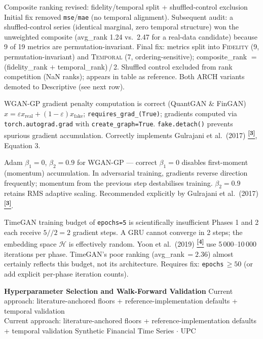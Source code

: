 \documentclass[10pt]{article}
\newcommand{\pagehead}[2]{%
  \begin{tcolorbox}[enhanced,arc=0pt,outer arc=0pt,boxrule=0pt,
    colback=Navy,colframe=Navy,
    top=5pt,bottom=5pt,left=8pt,right=8pt,
    before skip=0pt,after skip=10pt]
  {\color{white}\large\bfseries #1}%
  \ifx\relax#2\relax\else\\[1pt]{\color{blue!30!white}\small #2}\fi
  \hfill{\color{blue!20!white}\footnotesize Synthetic Financial Time Series $\cdot$ UPC}
  \end{tcolorbox}}
\newcommand{\tcite}[1]{%
  \hyperlink{R:#1}{\textsuperscript{\scriptsize\textbf{[#1]}}}}
\begin{document}
%
  {Composite ranking revised: fidelity/temporal split + shuffled-control exclusion}%
  {Initial fix removed \texttt{mse}/\texttt{mae} (no temporal alignment). Subsequent audit: a shuffled-control series (identical marginal, zero temporal structure) won the unweighted composite (avg\_rank 1.24 vs.\ 2.47 for a real-data candidate) because 9 of 19 metrics are permutation-invariant. Final fix: metrics split into \textsc{Fidelity} (9, permutation-invariant) and \textsc{Temporal} (7, ordering-sensitive); composite\_rank $=$ (fidelity\_rank $+$ temporal\_rank)\,/\,2. Shuffled control excluded from rank competition (NaN ranks); appears in table as reference. Both ARCH variants demoted to Descriptive (see next row).}

%
  {WGAN-GP gradient penalty computation is correct (QuantGAN \& FinGAN)}%
  {$\hat{x} = \varepsilon x_\text{real} + (1-\varepsilon)x_\text{fake}$; \texttt{requires\_grad\_(True)}; gradients computed via \texttt{torch.autograd.grad} with \texttt{create\_graph=True}. \texttt{fake.detach()} prevents spurious gradient accumulation. Correctly implements Gulrajani et al.\ (2017)\tcite{3}, Equation 3.}

%
  {Adam $\beta_1=0$, $\beta_2=0.9$ for WGAN-GP --- correct}%
  {$\beta_1=0$ disables first-moment (momentum) accumulation. In adversarial training, gradients reverse direction frequently; momentum from the previous step destabilises training. $\beta_2=0.9$ retains RMS adaptive scaling. Recommended explicitly by Gulrajani et al.\ (2017)\tcite{3}.}

%
  {TimeGAN training budget of \texttt{epochs=5} is scientifically insufficient}%
  {Phases 1 and 2 each receive $5//2=2$ gradient steps. A GRU cannot converge in 2 steps; the embedding space $\mathcal{H}$ is effectively random. Yoon et al.\ (2019)\tcite{4} use 5\,000--10\,000 iterations per phase. TimeGAN's poor ranking (avg\_rank\,$=2.36$) almost certainly reflects this budget, not its architecture. Requires fix: \texttt{epochs}\,$\geq 50$ (or add explicit per-phase iteration counts).}

\clearpage

\pagehead{Hyperparameter Selection and Walk-Forward Validation}
         {Current approach: literature-anchored floors + reference-implementation defaults + temporal validation}
\end{document}
